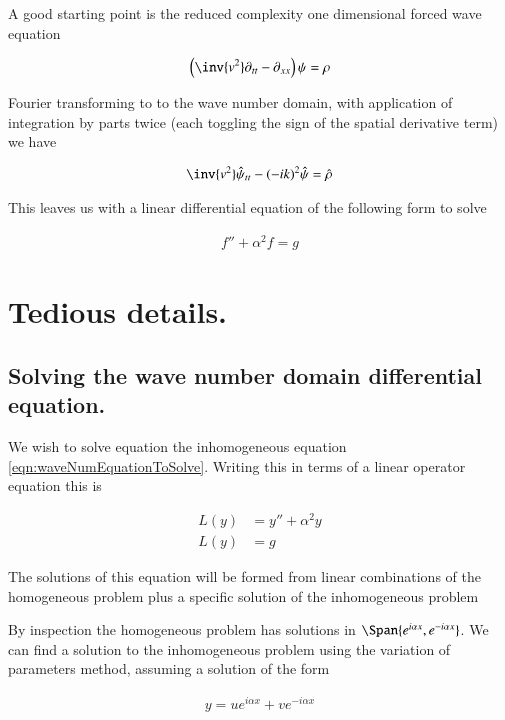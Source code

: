 \documentclass{article}
\begin{document}
A good starting point is the reduced complexity one dimensional forced
wave equation

\begin{align}
\left( \inv{v^2} \partial_{tt} -\partial_{xx} \right)\psi = \rho
\end{align}

Fourier transforming to to the wave number domain, with application of integration by parts twice (each toggling the sign of the spatial 
derivative term) we have

\begin{align*}
\inv{v^2}\hat{\psi}_{tt} - (-i k)^2 \hat{\psi} = \hat{\rho}
\end{align*}

This leaves us with a linear differential equation of the following form to solve

\begin{align}\label{eqn:waveNumEquationToSolve}
f'' + \alpha^2 f = g
\end{align}



\section{ Tedious details. }

\subsection{ Solving the wave number domain differential equation. }

We wish to solve equation the inhomogeneous equation \ref{eqn:waveNumEquationToSolve}.  Writing this in terms of a linear operator equation this is

\begin{align*}
L(y) &= y'' + \alpha^2 y \\
L(y) &= g
\end{align*}

The solutions of this equation will be formed from linear combinations of the homogeneous problem plus a specific solution of the inhomogeneous problem

By inspection the homogeneous problem has solutions in $\Span \{ e^{ i \alpha x }, e^{ -i \alpha x }\}$.
We can find a solution to the inhomogeneous problem using the variation of parameters method, assuming a solution of the form

\begin{align*}
y  = u e^{ i \alpha x } + v e^{ -i \alpha x } 
\end{align*}
\end{document}
